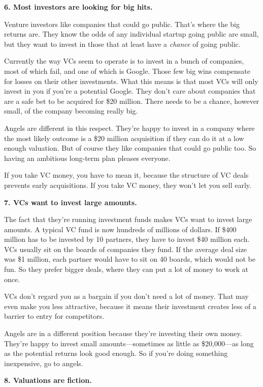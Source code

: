 \documentclass[12pt]{book}
\begin{document}
\textbf{6. Most investors are looking for big hits.}

Venture investors like companies that could go public. That's where the
big returns are. They know the odds of any individual startup going
public are small, but they want to invest in those that at least have a
\emph{chance} of going public.

Currently the way VCs seem to operate is to invest in a bunch of
companies, most of which fail, and one of which is Google. Those few big
wins compensate for losses on their other investments. What this means
is that most VCs will only invest in you if you're a potential Google.
They don't care about companies that are a safe bet to be acquired for
\$20 million. There needs to be a chance, however small, of the company
becoming really big.

Angels are different in this respect. They're happy to invest in a
company where the most likely outcome is a \$20 million acquisition if
they can do it at a low enough valuation. But of course they like
companies that could go public too. So having an ambitious long-term
plan pleases everyone.

If you take VC money, you have to mean it, because the structure of VC
deals prevents early acquisitions. If you take VC money, they won't let
you sell early.

\textbf{7. VCs want to invest large amounts.}

The fact that they're running investment funds makes VCs want to invest
large amounts. A typical VC fund is now hundreds of millions of dollars.
If \$400 million has to be invested by 10 partners, they have to invest
\$40 million each. VCs usually sit on the boards of companies they fund.
If the average deal size was \$1 million, each partner would have to sit
on 40 boards, which would not be fun. So they prefer bigger deals, where
they can put a lot of money to work at once.

VCs don't regard you as a bargain if you don't need a lot of money. That
may even make you less attractive, because it means their investment
creates less of a barrier to entry for competitors.

Angels are in a different position because they're investing their own
money. They're happy to invest small amounts---sometimes as little as
\$20,000---as long as the potential returns look good enough. So if
you're doing something inexpensive, go to angels.

\textbf{8. Valuations are fiction.}
\end{document}
